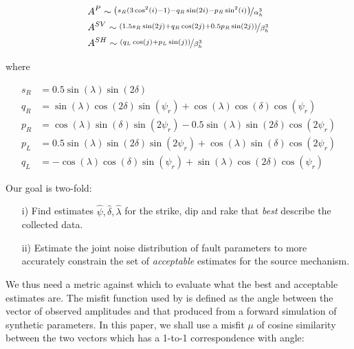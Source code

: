 \documentclass[preprint]{seismica}
\begin{document}
    \begin{align} \label{eq:1}
      \nonumber &A^P \sim \nicefrac{\left( s_R(3\cos^2(i) - 1) - q_R\sin(2i) - p_R\sin^2(i)\right)}{\alpha_h^3}\\
      &A^{SV} \sim \nicefrac{\left( 1.5 s_R\sin(2j) + q_R\cos(2j) + 0.5 p_R\sin(2j) \right)}{\beta_h^3}\\
      \nonumber &A^{SH} \sim \nicefrac{\left( q_L\cos(j) + p_L\sin(j) \right)}{\beta_h^3}
    \end{align}

    where

    \begin{align} \label{eq:2}
      \nonumber s_R &= 0.5 \sin(\lambda) \sin(2\delta)\\
      \nonumber q_R &= \sin(\lambda) \cos(2\delta) \sin(\psi_r) + \cos(\lambda) \cos(\delta) \cos(\psi_r)\\
      p_R &= \cos(\lambda) \sin(\delta) \sin(2\psi_r) - 0.5\sin(\lambda) \sin(2\delta) \cos(2\psi_r)\\
      \nonumber p_L &= 0.5\sin(\lambda) \sin(2\delta) \sin(2\psi_r) + \cos(\lambda) \sin(\delta) \cos(2\psi_r)\\
      \nonumber q_L &= -\cos(\lambda) \cos(\delta) \sin(\psi_r) + \sin(\lambda) \cos(2\delta) \cos(\psi_r)
    \end{align}

    Our goal is two-fold:
    \begin{enumerate}
      \item [i)]
        Find estimates $\widehat{\psi}, \widehat{\delta}, \widehat{\lambda}$ for the strike, dip
        and rake that \textit{best} describe the collected data.

      \item [ii)]
        Estimate the joint noise distribution of fault parameters to more accurately constrain the
        set of \textit{acceptable} estimates for the source mechanism.
        
    \end{enumerate}

    We thus need a metric against which to evaluate what the best and acceptable estimates are. The
    misfit function used by \citet{sita_potential_2022} is defined as the angle between the vector of
    observed amplitudes and that produced from a forward simulation of synthetic parameters.
    In this paper, we shall use a misfit $\mu$ of cosine similarity between the two vectors which has a
    1-to-1 correspondence with angle:
\end{document}
